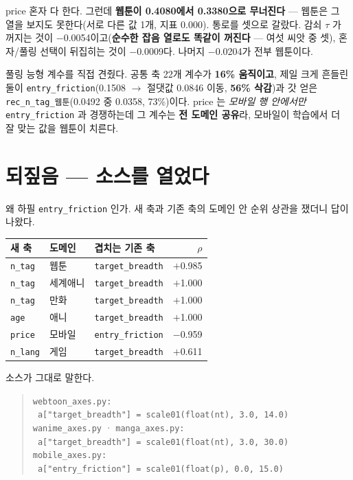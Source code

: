 \documentclass[10pt]{article}
\begin{document}
price 혼자 다 한다. 그런데 \textbf{웹툰이 0.4080에서 0.3380으로 무너진다} ---
웹툰은 그 열을 보지도 못한다(서로 다른 값 1개, 지표 0.000). 통로를 셋으로
갈랐다. 감쇠 $\tau$ 가 꺼지는 것이 $-$0.0054이고(\textbf{순수한 잡음 열로도
똑같이 꺼진다} --- 여섯 씨앗 중 셋), 혼자/풀링 선택이 뒤집히는 것이
$-$0.0009다. 나머지 $-$0.0204가 전부 웹툰이다.

풀링 능형 계수를 직접 견줬다. 공통 축 22개 계수가 \textbf{16\% 움직이고}, 제일
크게 흔들린 둘이 \texttt{entry\_friction}(0.1508 $\to$ 절댓값 0.0846 이동,
\textbf{56\% 삭감})과 갓 얻은 \texttt{rec\_n\_tag\_웹툰}(0.0492 중 0.0358,
73\%)이다. price 는 \emph{모바일 행 안에서만} \texttt{entry\_friction} 과
경쟁하는데 그 계수는 \textbf{전 도메인 공유}라, 모바일이 학습에서 더 잘 맞는
값을 웹툰이 치른다.

\section{되짚음 --- 소스를 열었다}

왜 하필 \texttt{entry\_friction} 인가. 새 축과 기존 축의 도메인 안 순위
상관을 쟀더니 답이 나왔다.

\begin{center}\small
\begin{tabular}{lll r}
\hline
새 축 & 도메인 & 겹치는 기존 축 & $\rho$ \\
\hline
\texttt{n\_tag} & 웹툰 & \texttt{target\_breadth} & $+$0.985 \\
\texttt{n\_tag} & 세계애니 & \texttt{target\_breadth} & $+$1.000 \\
\texttt{n\_tag} & 만화 & \texttt{target\_breadth} & $+$1.000 \\
\texttt{age} & 애니 & \texttt{target\_breadth} & $+$1.000 \\
\texttt{price} & 모바일 & \texttt{entry\_friction} & $-$0.959 \\
\texttt{n\_lang} & 게임 & \texttt{target\_breadth} & $+$0.611 \\
\hline
\end{tabular}
\end{center}

소스가 그대로 말한다.

\begin{quote}\small
\texttt{webtoon\_axes.py:} \\
\texttt{\ a["target\_breadth"] = scale01(float(nt), 3.0, 14.0)} \\[2pt]
\texttt{wanime\_axes.py} · \texttt{manga\_axes.py:} \\
\texttt{\ a["target\_breadth"] = scale01(float(nt), 3.0, 30.0)} \\[2pt]
\texttt{mobile\_axes.py:} \\
\texttt{\ a["entry\_friction"] = scale01(float(p), 0.0, 15.0)}
\end{quote}
\end{document}

